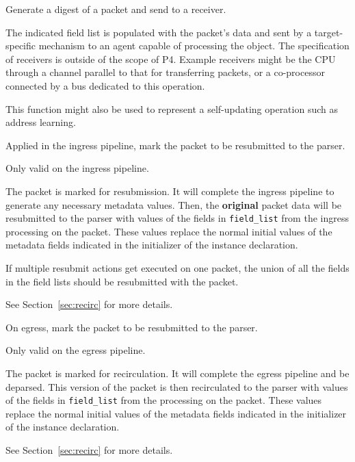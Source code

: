 \documentclass[12pt]{article}
\begin{document}

{ %
Generate a digest of a packet and send to a receiver.
}
{ %
}
{ %
The indicated field list is populated with the packet's data and sent by 
a target-specific mechanism to an agent capable of processing the object. 
 The specification of receivers is outside of the scope of P4. Example receivers 
might be the CPU through a channel parallel to that for transferring packets, 
or a co-processor connected by a bus dedicated to this operation. 

This function might also be used to represent a self-updating operation such 
as address learning.
}


{%
Applied in the ingress pipeline, mark the packet to be resubmitted to the 
parser.
}
{ %
}
{ %
Only valid on the ingress pipeline.

The packet is marked for resubmission. It will complete the ingress pipeline 
to generate any necessary metadata values. Then, the \textbf{original} packet data 
will be resubmitted to the parser with values of the fields in \texttt{field_list} from 
the ingress processing on the packet. These values replace the normal initial 
values of the metadata fields indicated in the initializer of the instance 
declaration.

If multiple resubmit actions get executed on one packet, the union of all 
the fields in the field lists should be resubmitted with the packet.

See Section~\ref{sec:recirc} for more details.

}


{ %
On egress, mark the packet to be resubmitted to the parser.
}
{ %
}
{ %
Only valid on the egress pipeline.

The packet is marked for  {\color{red}recirculation}. It will complete the egress pipeline 
and be deparsed.  This version of the packet is then {\color{red}recirculated} to the parser 
with values of the fields in \texttt{field_list} from the processing on the packet. 
These values replace the normal initial values of the metadata fields indicated 
in the initializer of the instance declaration.

See Section~\ref{sec:recirc} for more details.

}
\end{document}
